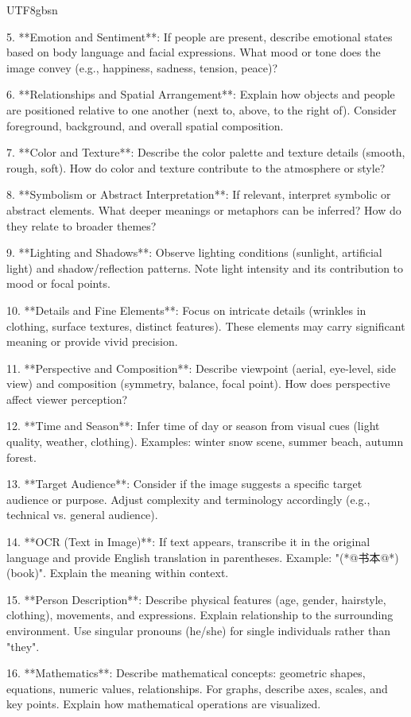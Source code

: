 \begin{CJK*}{UTF8}{gbsn}
\begin{tcblisting}
5. **Emotion and Sentiment**:
If people are present, describe emotional states based on body language and facial expressions.
What mood or tone does the image convey (e.g., happiness, sadness, tension, peace)?

6. **Relationships and Spatial Arrangement**:
Explain how objects and people are positioned relative to one another (next to, above, to the right of).
Consider foreground, background, and overall spatial composition.

7. **Color and Texture**:
Describe the color palette and texture details (smooth, rough, soft).
How do color and texture contribute to the atmosphere or style?

8. **Symbolism or Abstract Interpretation**:
If relevant, interpret symbolic or abstract elements.
What deeper meanings or metaphors can be inferred? How do they relate to broader themes?

9. **Lighting and Shadows**:
Observe lighting conditions (sunlight, artificial light) and shadow/reflection patterns.
Note light intensity and its contribution to mood or focal points.

10. **Details and Fine Elements**:
Focus on intricate details (wrinkles in clothing, surface textures, distinct features).
These elements may carry significant meaning or provide vivid precision.

11. **Perspective and Composition**:
Describe viewpoint (aerial, eye-level, side view) and composition (symmetry, balance, focal point).
How does perspective affect viewer perception?

12. **Time and Season**:
Infer time of day or season from visual cues (light quality, weather, clothing).
Examples: winter snow scene, summer beach, autumn forest.

13. **Target Audience**:
Consider if the image suggests a specific target audience or purpose.
Adjust complexity and terminology accordingly (e.g., technical vs. general audience).

14. **OCR (Text in Image)**:
If text appears, transcribe it in the original language and provide English translation in parentheses.
Example: "(*@书本@*) (book)". Explain the meaning within context.

15. **Person Description**:
Describe physical features (age, gender, hairstyle, clothing), movements, and expressions.
Explain relationship to the surrounding environment.
Use singular pronouns (he/she) for single individuals rather than "they".

16. **Mathematics**:
Describe mathematical concepts: geometric shapes, equations, numeric values, relationships.
For graphs, describe axes, scales, and key points.
Explain how mathematical operations are visualized.


\end{tcblisting}
\end{CJK*}
